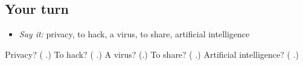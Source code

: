 \subsection*{Your turn}
\begin{itemize}
\raggedright
  \item \emph{Say it:} privacy, to hack, a virus, to share, artificial intelligence
\end{itemize}

\begin{tcolorbox}[breakable,colback=teal!4,colframe=teal!35!black,title={Before you move on}]
Privacy? (\textbf{ }.) To hack? (\textbf{ }.) A virus? (\textbf{}.) To share? (\textbf{  }.) Artificial intelligence? (\textbf{ }.)
\end{tcolorbox}
